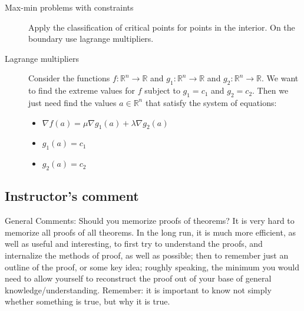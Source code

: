 \begin{description}
\item[Max-min problems with constraints]
Apply the classification of critical points for points in the interior. On the boundary use lagrange multipliers.
\item[Lagrange multipliers]
Consider the functions $f: \mathbb{R}^n \to \mathbb{R}$ and $g_1: \mathbb{R}^n \to \mathbb{R}$ and $g_2: \mathbb{R}^n \to \mathbb{R}$. We want to find the extreme values for $f$ subject to $g_1 = c_1$ and $g_2 = c_2$. Then we just need find the values $a \in \mathbb{R}^n$ that satisfy the system of equations:
	\begin{itemize}
		\item $\nabla f(a) = \mu \nabla g_1(a) + \lambda \nabla g_2(a)$
		\item $g_1(a) = c_1$
		\item $g_2(a) = c_2$
	\end{itemize}
\end{description}



\subsection{Instructor's comment}
General Comments: Should you memorize proofs of theorems? It is very hard to
memorize all proofs of all theorems. In the long run, it is much more efficient, as well
as useful and interesting, to first try to understand the proofs, and internalize the
methods of proof, as well as possible; then to remember just an outline of the proof,
or some key idea; roughly speaking, the minimum you would need to allow yourself
to reconstruct the proof out of your base of general knowledge/understanding.
Remember: it is important to know not simply whether something is true, but why
it is true.



